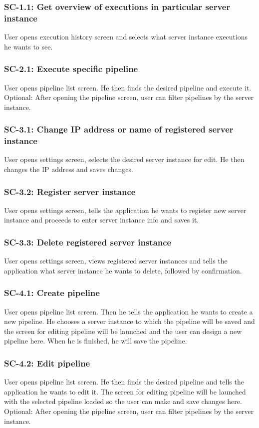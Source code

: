 \subsubsection*{SC-1.1: Get overview of executions in particular server instance}
User opens execution history screen and selects what server instance executions he wants to see.
\subsubsection*{SC-2.1: Execute specific pipeline}
User opens pipeline list screen. He then finds the desired pipeline and execute it. Optional: After opening the pipeline screen, user can filter pipelines by the server instance.
\subsubsection*{SC-3.1: Change IP address or name of registered server instance}
User opens settings screen, selects the desired server instance for edit. He then changes the IP address and saves changes.
\subsubsection*{SC-3.2: Register server instance}
User opens settings screen, tells the application he wants to register new server instance and proceeds to enter server instance info and saves it.
\subsubsection*{SC-3.3: Delete registered server instance}
User opens settings screen, views registered server instances and tells the application what server instance he wants to delete, followed by confirmation.
\subsubsection*{SC-4.1: Create pipeline}
User opens pipeline list screen. Then he tells the application he wants to create a new pipeline. He chooses a server instance to which the pipeline will be saved and the screen for editing pipeline will be launched and the user can design a new pipeline here. When he is finished, he will save the pipeline.
\subsubsection*{SC-4.2: Edit pipeline}
User opens pipeline list screen. He then finds the desired pipeline and tells the application he wants to edit it. The screen for editing pipeline will be launched with the selected pipeline loaded so the user can make and save changes here. Optional: After opening the pipeline screen, user can filter pipelines by the server instance.
